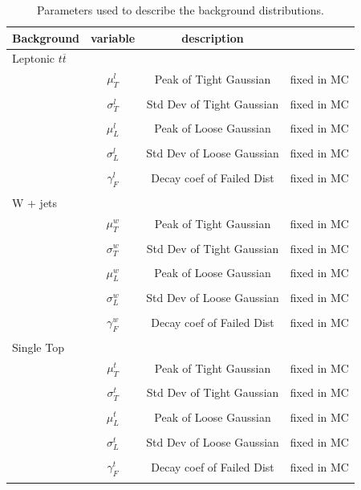 \begin{table}
\centering
\begin{tabular}{l | c  c  c}
Background & variable & description & \\
\hline\hline
Leptonic $t\overline{t}$ & & & \\
& $\mu^l_T$ & Peak of Tight Gaussian & fixed in MC\\
\\
& $\sigma^l_T$ & Std Dev of Tight Gaussian & fixed in MC\\
\\
& $\mu^l_L$ & Peak of Loose Gaussian & fixed in MC\\
\\
& $\sigma^l_L$ & Std Dev of Loose Gaussian & fixed in MC\\
\\
& $\gamma^l_F$ & Decay coef of Failed Dist & fixed in MC\\
\\
\hline
W + jets & & & \\
& $\mu^w_T$ & Peak of Tight Gaussian & fixed in MC\\
\\
& $\sigma^w_T$ & Std Dev of Tight Gaussian & fixed in MC\\
\\
& $\mu^w_L$ & Peak of Loose Gaussian & fixed in MC\\
\\
& $\sigma^w_L$ & Std Dev of Loose Gaussian & fixed in MC\\
\\
& $\gamma^w_F$ & Decay coef of Failed Dist & fixed in MC\\
\\
\hline
Single Top & & & \\
& $\mu^t_T$ & Peak of Tight Gaussian & fixed in MC\\
\\
& $\sigma^t_T$ & Std Dev of Tight Gaussian & fixed in MC\\
\\
& $\mu^t_L$ & Peak of Loose Gaussian & fixed in MC\\
\\
& $\sigma^t_L$ & Std Dev of Loose Gaussian & fixed in MC\\
\\
& $\gamma^t_F$ & Decay coef of Failed Dist & fixed in MC\\
\\
\hline
\end{tabular}
\caption{Parameters used to describe the background distributions.} \label{tab:mcval}
\end{table}
